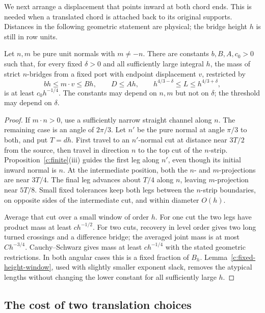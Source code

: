 We next arrange a displacement that points inward at both chord ends.
This is needed when a translated chord is attached back to its original
supports. Distances in the following geometric statement are physical;
the bridge height $h$ is still in row units.

\begin{lemma}\label{c:positive-projection}
Let $n,m$ be pure unit normals with $m\ne-n$. There are constants
$b,B,A,c_0>0$ such that, for every fixed $\delta>0$ and all sufficiently
large integral $h$, the mass of strict $n$-bridges from a fixed port
with endpoint displacement $v$, restricted by
\[
 bh\le m\cdot v\le Bh,\qquad D\le Ah,\qquad
 h^{4/3-\delta}\le L\le h^{4/3+\delta},
\]
is at least $c_0h^{-1/4}$. The constants may depend on $n,m$ but not
on $\delta$; the threshold may depend on $\delta$.
\end{lemma}
\begin{proof}
If $m\cdot n>0$, use a sufficiently narrow straight channel along $n$.
The remaining case is an angle of $2\pi/3$. Let $n'$ be the pure normal
at angle $\pi/3$ to both, and put $T=dh$. First travel to an $n'$-normal
cut at distance near $3T/2$ from the source, then travel in direction
$n$ to the top cut of the $n$-strip. Proposition~\ref{c:finite}(iii)
guides the first leg along $n'$, even though its initial inward normal
is $n$. At the intermediate position, both the $n$- and $m$-projections
are near $3T/4$. The final leg advances about $T/4$ along $n$, leaving
$m$-projection near $5T/8$. Small fixed tolerances keep both legs
between the $n$-strip boundaries, on opposite sides of the intermediate
cut, and within diameter $O(h)$.

Average that cut over a small window of order $h$. For one cut the two
legs have product mass at least $ch^{-1/2}$. For two cuts, recovery in
level order gives two long turned crossings and a difference bridge;
the averaged joint mass is at most $Ch^{-3/4}$. Cauchy--Schwarz gives
mass at least $ch^{-1/4}$ with the stated geometric restrictions.
In both angular cases this is a fixed fraction of $B_h$.
Lemma~\ref{c:fixed-height-window}, used with slightly smaller exponent
slack, removes the atypical lengths without changing the lower constant
for all sufficiently large $h$.
\end{proof}

\subsection{The cost of two translation choices}

